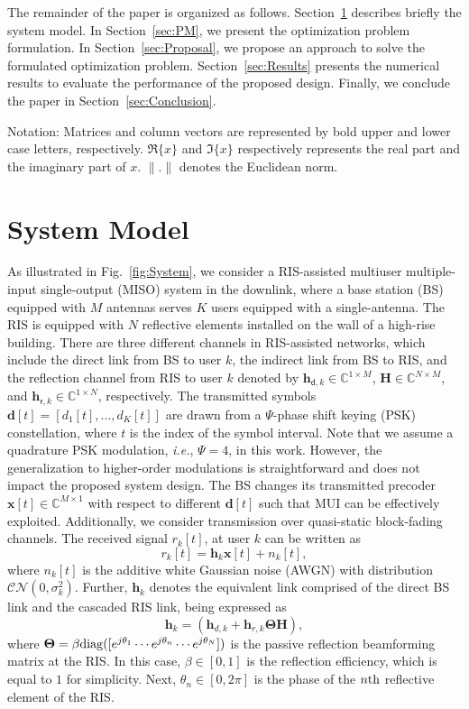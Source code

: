 \documentclass[10pt,conference]{IEEEtran}
\newcommand{\sfr}{\mathsf{r}}
\newcommand{\sfd}{\mathsf{d}}
\newcommand{\bfH}{\mathbf{H}}
\newcommand{\bfh}{\mathbf{h}}
\newcommand{\bfx}{\mathbf{x}}
\newcommand{\bfd}{\mathbf{d}}
\newcommand{\bfTheta}{\boldsymbol{\Theta}}
\begin{document}
The remainder of the paper is organized as follows. Section~\ref{sec:SM} describes briefly the system model. In Section~\ref{sec:PM}, we present the optimization problem formulation. In Section~\ref{sec:Proposal}, we propose an approach to solve the formulated optimization problem. Section~\ref{sec:Results} presents the numerical results to evaluate the performance of the proposed design. Finally, we conclude the paper in Section~\ref{sec:Conclusion}.

Notation: Matrices and column vectors are represented by bold upper and lower case letters, respectively. $\Re\{x\}$ and $\Im\{x\}$ respectively represents the real part and the imaginary part of $x$. $\|.\|$ denotes the Euclidean norm.
\section{System Model}\label{sec:SM}

As illustrated in Fig.~\ref{fig:System}, we consider a RIS-assisted multiuser multiple-input single-output (MISO) system in the downlink, where a base station (BS) equipped with $M$ antennas serves $K$ users equipped with a single-antenna. The RIS is equipped with $N$ reflective elements installed on the wall of a high-rise building.
There are three different channels in RIS-assisted networks, which include the direct link from BS to user $k$, the indirect link from BS to RIS, and the reflection channel from RIS to user $k$ denoted by $\bfh_{\sfd,k} \in \mathbb{C}^{1\times M}$, $\mathbf{H} \in \mathbb{C}^{N\times M}$,  and $\bfh_{\sfr,k} \in \mathbb{C}^{1\times N}$, respectively.
The transmitted symbols $\bfd[t]=[d_1[t],...,d_K[t]]$ are drawn from a $\Psi$-phase shift keying (PSK) constellation, where $t$ is the index of the symbol interval. Note that we assume a quadrature PSK modulation, \textit{i.e.}, $\Psi=4$, in this work. However, the generalization to higher-order modulations is straightforward and does not impact the proposed system design.
 The BS changes its transmitted precoder $\bfx[t] \in \mathbb{C}^{M\times 1}$ with respect to different $\bfd[t]$ such that MUI can be effectively exploited. Additionally, we consider transmission over  quasi-static block-fading channels. The received signal $   r_k[t]$, at user $k$ can be written as 
\begin{equation}
    r_k[t]=\bfh_k\bfx[t]+n_k[t],
\end{equation}
where $n_k[t]$ is the additive white Gaussian noise (AWGN) with distribution $\mathcal{CN}(0,\sigma_k^{2})$. Further, $\bfh_k$ denotes the equivalent link comprised of the direct BS link and the cascaded RIS link, being expressed as
\begin{equation}
    \bfh_k=(\bfh_{d,k}+\bfh_{r,k}\bfTheta\bfH),
\end{equation} 
where $\bfTheta=\beta{\rm diag}([e^{j\theta_1} \cdots e^{j\theta_n} \cdots e^{j\theta_N}])$ is the passive reflection beamforming matrix at the RIS. In this case, $\beta \in [0 
, 1]$ is the reflection efficiency, which is equal to $1$ for simplicity. Next, $ \theta_n\in[0,2\pi] $ is the phase of the $n{\rm th}$ reflective element of the RIS.
\end{document}
